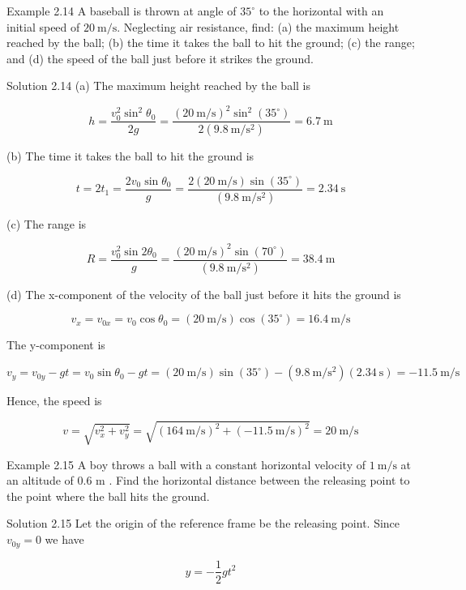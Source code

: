 \documentclass[10pt]{article}
\numberwithin{equation}{section}
\begin{document}
Example 2.14 A baseball is thrown at angle of $35^{\circ}$ to the horizontal with an initial speed of $20 \mathrm{~m} / \mathrm{s}$. Neglecting air resistance, find: (a) the maximum height reached by the ball; (b) the time it takes the ball to hit the ground; (c) the range; and (d) the speed of the ball just before it strikes the ground.

Solution 2.14 (a) The maximum height reached by the ball is

$$
h=\frac{v_{0}^{2} \sin ^{2} \theta_{0}}{2 g}=\frac{(20 \mathrm{~m} / \mathrm{s})^{2} \sin ^{2}\left(35^{\circ}\right)}{2\left(9.8 \mathrm{~m} / \mathrm{s}^{2}\right)}=6.7 \mathrm{~m}
$$

(b) The time it takes the ball to hit the ground is

$$
t=2 t_{1}=\frac{2 v_{0} \sin \theta_{0}}{g}=\frac{2(20 \mathrm{~m} / \mathrm{s}) \sin \left(35^{\circ}\right)}{\left(9.8 \mathrm{~m} / \mathrm{s}^{2}\right)}=2.34 \mathrm{~s}
$$

(c) The range is

$$
R=\frac{v_{0}^{2} \sin 2 \theta_{0}}{g}=\frac{(20 \mathrm{~m} / \mathrm{s})^{2} \sin \left(70^{\circ}\right)}{\left(9.8 \mathrm{~m} / \mathrm{s}^{2}\right)}=38.4 \mathrm{~m}
$$

(d) The x-component of the velocity of the ball just before it hits the ground is

$$
v_{x}=v_{0 x}=v_{0} \cos \theta_{0}=(20 \mathrm{~m} / \mathrm{s}) \cos \left(35^{\circ}\right)=16.4 \mathrm{~m} / \mathrm{s}
$$

The y-component is

$$
v_{y}=v_{0 y}-g t=v_{0} \sin \theta_{0}-g t=(20 \mathrm{~m} / \mathrm{s}) \sin \left(35^{\circ}\right)-\left(9.8 \mathrm{~m} / \mathrm{s}^{2}\right)(2.34 \mathrm{~s})=-11.5 \mathrm{~m} / \mathrm{s}
$$

Hence, the speed is

$$
v=\sqrt{v_{x}^{2}+v_{y}^{2}}=\sqrt{(164 \mathrm{~m} / \mathrm{s})^{2}+(-11.5 \mathrm{~m} / \mathrm{s})^{2}}=20 \mathrm{~m} / \mathrm{s}
$$

Example 2.15 A boy throws a ball with a constant horizontal velocity of $1 \mathrm{~m} / \mathrm{s}$ at an altitude of 0.6 m . Find the horizontal distance between the releasing point to the point where the ball hits the ground.

Solution 2.15 Let the origin of the reference frame be the releasing point. Since $v_{0 y}=0$ we have

$$
y=-\frac{1}{2} g t^{2}
$$
\end{document}
